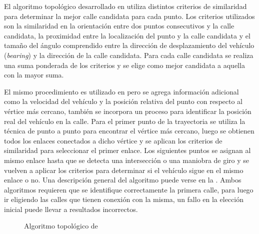 El algoritmo topológico desarrollado en \citep{greenfeld2002matching} utiliza distintos criterios de similaridad para determinar la mejor calle candidata para cada punto. Los criterios utilizados son la similaridad en la orientación entre dos puntos consecutivos y la calle candidata, la proximidad entre la localización del punto y la calle candidata y el tamaño del ángulo comprendido entre la dirección de desplazamiento del vehículo (\emph{bearing}) y la dirección de la calle candidata. Para cada calle candidata se realiza una suma ponderada de los criterios y se elige como mejor candidata a aquella con la mayor suma. 

El mismo procedimiento es utilizado en \citep{quddus2003general} pero se agrega información adicional como la velocidad del vehículo y la posición relativa del punto con respecto al vértice más cercano, también se incorpora un proceso para identificar la posición real del vehículo en la calle. Para el primer punto de la trayectoria se utiliza la técnica de punto a punto para encontrar el vértice más cercano, luego se obtienen todos los enlaces conectados a dicho vértice y se aplican los criterios de similaridad para seleccionar el primer enlace. Los siguientes puntos se asignan al mismo enlace hasta que se detecta una intersección o una maniobra de giro y se vuelven a aplicar los criterios para determinar si el vehículo sigue en el mismo enlace o no. Una descripción general del algoritmo puede verse en la . Ambos algoritmos requieren que se identifique correctamente la primera calle, para luego ir eligiendo las calles que tienen conexión con la misma, un fallo en la elección inicial puede llevar a resultados incorrectos.

\begin{figure}[h]
\centering
\begin{singlespace}
\end{singlespace}
\caption{Algoritmo topológico de \citep{quddus2003general}}
\label{fig:algoritmo-topologico} 
\end{figure}

